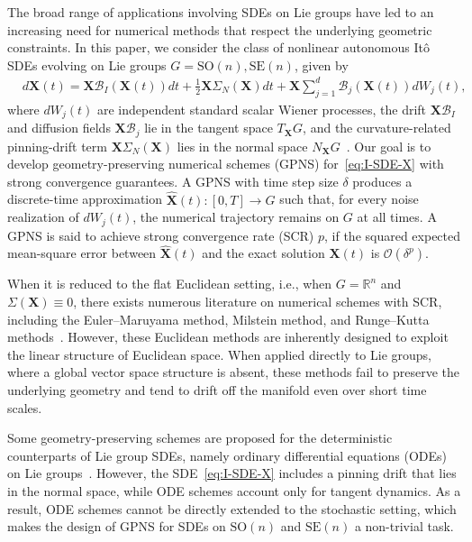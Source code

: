 \documentclass[11pt, a4paper, onecolumn]{article}
\newcommand{\SOn}{\mathrm{SO}(n)}
\newcommand{\SEn}{\mathrm{SE}(n)}
\newcommand{\X}{\bf{X}}
\newcommand{\B}{\mathcal{B}}
\newcommand{\hatX}{\widehat{\bf X}}
\renewcommand{\bf}[1]{\mathbf{#1}}
\newcommand{\tg}[1]{\mathcal{#1}}
\newcommand{\nm}[1]{\mathsf{#1}}
\newcommand{\calO}{\mathcal{O}}
\newcommand{\half}{{\frac{1}{2}}}
\begin{document}
The broad range of applications involving SDEs on Lie groups have led to an increasing need for numerical methods that respect the underlying geometric constraints. In this paper, we consider the class of nonlinear autonomous It\^o SDEs evolving on Lie groups $G = \SOn,\SEn$, given by
\begin{align}\label{eq:I-SDE-X}
    & d\bf X(t) = \bf X \tg B_{I}(\bf X(t)) dt + \half\bf X \nm \Sigma_N(\X) dt+  \bf X\sum_{j=1}^d \B_{j}(\bf X(t)) dW_j(t),
\end{align}
where $dW_j(t)$ are independent standard scalar Wiener processes, the drift $\bf X\tg B_I$ and diffusion fields $\bf X\tg B_j$ lie in the tangent space $T_{\bf X}G$, and the curvature-related pinning-drift term $\bf X\Sigma_N(\X)$ lies in the normal space $N_{\bf X}G$~\cite{solo2024stratonovich}. Our goal is to develop geometry-preserving numerical schemes (GPNS) for~\cref{eq:I-SDE-X} with strong convergence guarantees. A GPNS with time step size $\delta$ produces a discrete-time approximation $\bf{\hatX}(t):[0,T]\to G$ such that, for every noise realization of $dW_j(t)$, the numerical trajectory remains on $G$ at all times. A GPNS is said to achieve strong convergence rate (SCR) $p$, if the squared expected mean-square error between $\bf{\hatX}(t)$ and the exact solution $\X(t)$ is $\calO(\delta^p)$.

When it is reduced to the flat Euclidean setting, i.e., when $G = \mathbb{R}^n$ and $\nm \Sigma(\X) \equiv 0$, there exists numerous literature on numerical schemes with SCR, including the Euler–Maruyama method, Milstein method, and Runge–Kutta methods~\cite{maruyama1955continuous,mil1975approximate,ripley2009stochastic}. However, these Euclidean methods are inherently designed to exploit the linear structure of Euclidean space. When applied directly to Lie groups, where a global vector space structure is absent, these methods fail to preserve the underlying geometry and tend to drift off the manifold even over short time scales. 


Some geometry-preserving schemes are proposed for the deterministic counterparts of Lie group SDEs, namely ordinary differential equations (ODEs) on Lie groups~\cite{munthekass1999high,munthe1998runge,hairer2006geometric}. However, the SDE~\cref{eq:I-SDE-X} includes a pinning drift that lies in the normal space, while ODE schemes account only for tangent dynamics. As a result, ODE schemes cannot be directly extended to the stochastic setting, which makes the design of GPNS for SDEs on $\SOn$ and $\SEn$ a non-trivial task.
\end{document}
